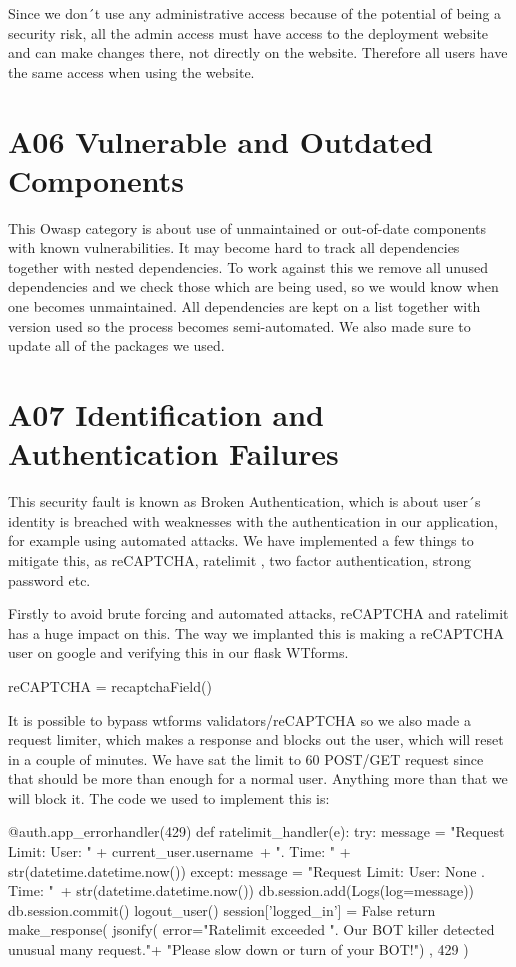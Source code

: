 Since we don´t use any administrative access because of the potential of being a security risk, all the admin access must have access to the deployment website and can make changes there, not directly on the website. Therefore all users have the same access when using the website.

\section{A06 Vulnerable and Outdated Components}

This Owasp category is about use of unmaintained or out-of-date components with known vulnerabilities. It may become hard to track all dependencies together with nested dependencies.
To work against this we remove all unused dependencies and we check those which are being used, so we would know when one becomes unmaintained. All dependencies are kept on a list together with version used so the process becomes semi-automated. We also made sure to update all of the packages we used. 

\section{A07 Identification and Authentication Failures}

This security fault is known as Broken Authentication, which is about user´s identity is breached with weaknesses with the authentication in our application, for example using automated attacks. We have implemented a few things to mitigate this, as reCAPTCHA, ratelimit , two factor authentication, strong password etc.   

Firstly to avoid brute forcing and automated attacks, reCAPTCHA and ratelimit has a huge impact on this. The way we implanted this is making a reCAPTCHA user on google and verifying this in our flask WTforms.
\begin{python}
reCAPTCHA = recaptchaField()
\end{python}

It is possible to bypass wtforms validators/reCAPTCHA so we also made a request limiter, which makes a response and blocks out the user, which will reset in a couple of minutes. We have sat the limit to 60 POST/GET request since that should be more than enough for a normal user. Anything more than that we will block it. The code we used to implement this is:

\begin{python}
@auth.app_errorhandler(429)
def ratelimit_handler(e):
    try:
        message = "Request Limit: User: " + current_user.username\
                  + ". Time: " + str(datetime.datetime.now())
    except:
        message = "Request Limit: User: None . Time: "\
                  + str(datetime.datetime.now())
    db.session.add(Logs(log=message))
    db.session.commit()
    logout_user()
    session['logged_in'] = False
    return make_response(
        jsonify(
            error="Ratelimit exceeded %
                  ". Our BOT killer detected unusual many request."+
                  "Please slow down or turn of your BOT!")
        , 429
    )
\end{python}

